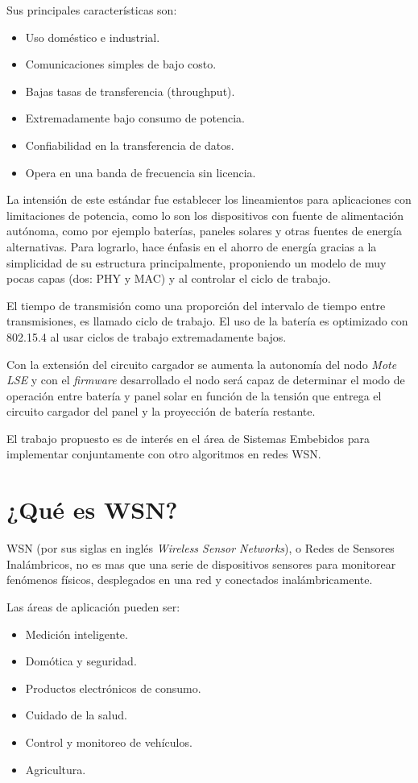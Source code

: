 \noindent Sus principales características son:
		\begin{itemize}
			\item Uso doméstico e industrial.
			\item Comunicaciones simples de bajo costo. 
			\item Bajas tasas de transferencia (throughput).
			\item Extremadamente bajo consumo de potencia.
			\item Confiabilidad en la transferencia de datos.
			\item Opera en una banda de frecuencia sin licencia.
		\end{itemize}

La intensión de este estándar fue establecer los lineamientos para aplicaciones con limitaciones de potencia, como lo son los dispositivos con fuente de alimentación autónoma, como por ejemplo baterías, paneles solares y otras fuentes de energía alternativas. Para lograrlo, hace énfasis en el ahorro de energía gracias a la simplicidad de su estructura principalmente, proponiendo un modelo de muy pocas capas (dos: PHY y MAC) y al controlar el ciclo de trabajo.

El tiempo de transmisión como una proporción del intervalo de tiempo entre transmisiones, es llamado ciclo de trabajo. El uso de la batería es optimizado con 802.15.4 al usar ciclos de trabajo extremadamente bajos. 
		
Con la extensión del circuito cargador se aumenta la autonomía del nodo \textit{Mote LSE} y con el \textit{firmware} desarrollado el nodo será capaz de determinar el modo de operación entre batería y panel solar en función de la tensión que entrega el circuito cargador del panel y la proyección de batería restante.

El trabajo propuesto es de interés en el área de Sistemas Embebidos para implementar conjuntamente con otro algoritmos en redes WSN.

\section{¿Qué es WSN?}
\label{sec:wsn}

WSN (por sus siglas en inglés \textit{Wireless Sensor Networks}), o Redes de Sensores Inalámbricos, no es mas que una serie de dispositivos sensores para monitorear fenómenos físicos, desplegados en una red y conectados inalámbricamente.

\noindent Las áreas de aplicación pueden ser:
		\begin{itemize}
			\item Medición inteligente.
			\item Domótica y seguridad.
			\item Productos electrónicos de consumo.
			\item Cuidado de la salud.
			\item Control y monitoreo de vehículos.
			\item Agricultura.
		\end{itemize}
		
